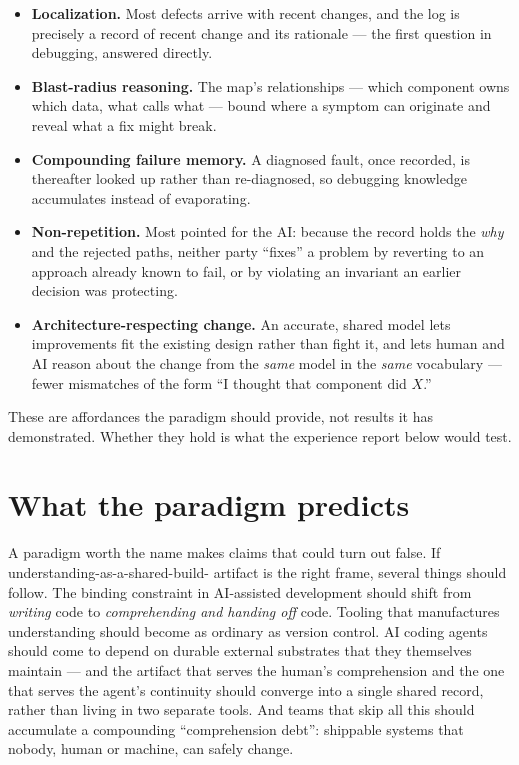 \documentclass[11pt]{article}
\begin{document}
\begin{itemize}
  \item \textbf{Localization.} Most defects arrive with recent changes, and the log is precisely a
  record of recent change and its rationale --- the first question in debugging, answered directly.

  \item \textbf{Blast-radius reasoning.} The map's relationships --- which component owns which data,
  what calls what --- bound where a symptom can originate and reveal what a fix might break.

  \item \textbf{Compounding failure memory.} A diagnosed fault, once recorded, is thereafter looked
  up rather than re-diagnosed, so debugging knowledge accumulates instead of evaporating.

  \item \textbf{Non-repetition.} Most pointed for the AI: because the record holds the \emph{why} and
  the rejected paths, neither party ``fixes'' a problem by reverting to an approach already known to
  fail, or by violating an invariant an earlier decision was protecting.

  \item \textbf{Architecture-respecting change.} An accurate, shared model lets improvements fit the
  existing design rather than fight it, and lets human and AI reason about the change from the
  \emph{same} model in the \emph{same} vocabulary --- fewer mismatches of the form ``I thought that
  component did $X$.''
\end{itemize}

These are affordances the paradigm should provide, not results it has demonstrated. Whether they hold
is what the experience report below would test.

\section{What the paradigm predicts}

A paradigm worth the name makes claims that could turn out false. If understanding-as-a-shared-build-%
artifact is the right frame, several things should follow. The binding constraint in AI-assisted
development should shift from \emph{writing} code to \emph{comprehending and handing off} code.
Tooling that manufactures understanding should become as ordinary as version control. AI coding
agents should come to depend on durable external substrates that they themselves maintain --- and the
artifact that serves the human's comprehension and the one that serves the agent's continuity should
converge into a single shared record, rather than living in two separate tools. And teams that skip
all this should accumulate a compounding ``comprehension debt'': shippable systems that nobody, human
or machine, can safely change.
\end{document}
